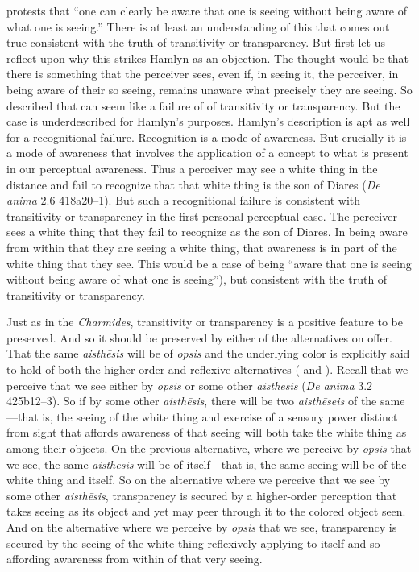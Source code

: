 \citet[122]{Hamlyn:1961ys} protests that ``one can clearly be aware that one is seeing without being aware of what one is seeing.'' There is at least an understanding of this that comes out true consistent with the truth of transitivity or transparency. But first let us reflect upon why this strikes Hamlyn as an objection. The thought would be that there is something that the perceiver sees, even if, in seeing it, the perceiver, in being aware of their so seeing, remains unaware what precisely they are seeing. So described that can seem like a failure of of transitivity or transparency. But the case is underdescribed for Hamlyn's purposes. Hamlyn's description is apt as well for a recognitional failure. Recognition is a mode of awareness. But crucially it is a mode of awareness that involves the application of a concept to what is present in our perceptual awareness. Thus a perceiver may see a white thing in the distance and fail to recognize that that white thing is the son of Diares (\emph{De anima} 2.6 418a20–1). But such a recognitional failure is consistent with transitivity or transparency in the first-personal perceptual case. The perceiver sees a white thing that they fail to recognize as the son of Diares. In being aware from within that they are seeing a white thing, that awareness is in part of the white thing that they see. This would be a case of being ``aware that one is seeing without being aware of what one is seeing''), but consistent with the truth of transitivity or transparency.

Just as in the \emph{Charmides}, transitivity or transparency is a positive feature to be preserved. And so it should be preserved by either of the alternatives on offer. That the same \emph{aisthēsis} will be of \emph{opsis} and the underlying color is explicitly said to hold of both the higher-order and reflexive alternatives (\citealt[401]{Osborne:1983le} and \citealt[765 n33]{caston02}). Recall that we perceive that we see either by \emph{opsis} or some other \emph{aisthēsis} (\emph{De anima} 3.2 425b12–3). So if by some other \emph{aisthēsis}, there will be two \emph{aisthēseis} of the same—that is, the seeing of the white thing and exercise of a sensory power distinct from sight that affords awareness of that seeing will both take the white thing as among their objects. On the previous alternative, where we perceive by \emph{opsis} that we see, the same \emph{aisthēsis} will be of itself—that is, the same seeing will be of the white thing and itself. So on the alternative where we perceive that we see by some other \emph{aisthēsis}, transparency is secured by a higher-order perception that takes seeing as its object and yet may peer through it to the colored object seen. And on the alternative where we perceive by \emph{opsis} that we see, transparency is secured by the seeing of the white thing reflexively applying to itself and so affording awareness from within of that very seeing. 

